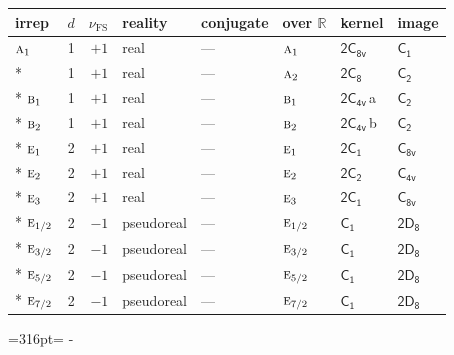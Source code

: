 \documentclass[10pt,a4paper]{article}
\makeatletter
\def\grouprule#1#2{\noalign{\marks\LTgroupmarks{\the\belowrulesep}\nobreak\vskip#1%
  \vskip\aboverulesep}\multispan\LT@cols\unskip{\leaders\hrule\@height#2\hfill\kern\z@}\cr
  \noalign{\penalty\LTrulebreak\vskip\belowrulesep\global\@lastruleclass\z@}}
\newcommand{\needspace}[1]{\par\penalty-100\begingroup\dimen0=#1\relax\dimen2=\pagegoal
  \advance\dimen2-\pagetotal\ifdim\dimen0>\dimen2\relax\ifdim\dimen2>0pt\vfil\break\fi\fi
  \endgroup}
\numberwithin{equation}{section}
\newcommand{\grp}[1]{\mathsf{#1}}
\newcommand{\irr}[1]{\text{\normalfont\scshape #1}}
\newcommand{\detbox}[1]{{\setlength{\fboxsep}{1pt}\fbox{#1}}}
\newcommand{\clsletter}[1]{\,{\scriptsize\color{black!55}#1}}
\newcommand{\fsind}{\nu_{\mathrm{FS}}}
\makeatother
\begin{document}
\setlength{\emergencystretch}{2em}\par\setlength{\emergencystretch}{0pt}
{\small\renewcommand{\arraystretch}{1.25}\setlength{\tabcolsep}{4pt}\begin{longtable}{@{}lrrlllll@{}}\toprule
irrep & $d$ & $\fsind$ & reality & conjugate & over $\mathbb{R}$ & kernel & image\\\midrule\endhead
\bottomrule\endfoot\endlastfoot
$\irr{a}_{1}$ & 1 & $+1$ & real & --- & $\irr{a}_{1}$ & \href{2C8v.pdf}{$\grp{2C_{8v}}$} & \href{../../../rotation/data/pdf/C1.pdf}{$\grp{C_{1}}$}\\*
\detbox{$\irr{a}_{2}$} & 1 & $+1$ & real & --- & $\irr{a}_{2}$ & \href{2C8.pdf}{$\grp{2C_{8}}$} & \href{../../../rotation/data/pdf/C2.pdf}{$\grp{C_{2}}$}\\*
$\irr{b}_{1}$ & 1 & $+1$ & real & --- & $\irr{b}_{1}$ & \href{2C4v.pdf}{$\grp{2C_{4v}}$}\clsletter{a} & \href{../../../rotation/data/pdf/C2.pdf}{$\grp{C_{2}}$}\\*
$\irr{b}_{2}$ & 1 & $+1$ & real & --- & $\irr{b}_{2}$ & \href{2C4v.pdf}{$\grp{2C_{4v}}$}\clsletter{b} & \href{../../../rotation/data/pdf/C2.pdf}{$\grp{C_{2}}$}\\*
$\irr{e}_{1}$ & 2 & $+1$ & real & --- & $\irr{e}_{1}$ & \href{2C1.pdf}{$\grp{2C_{1}}$} & \href{../../../rotation/data/pdf/C8v.pdf}{$\grp{C_{8v}}$}\\*
$\irr{e}_{2}$ & 2 & $+1$ & real & --- & $\irr{e}_{2}$ & \href{2C2.pdf}{$\grp{2C_{2}}$} & \href{../../../rotation/data/pdf/C4v.pdf}{$\grp{C_{4v}}$}\\*
$\irr{e}_{3}$ & 2 & $+1$ & real & --- & $\irr{e}_{3}$ & \href{2C1.pdf}{$\grp{2C_{1}}$} & \href{../../../rotation/data/pdf/C8v.pdf}{$\grp{C_{8v}}$}\\*
\grouprule{0pt}{\lightrulewidth}
$\irr{e}_{1/2}$ & 2 & $-1$ & pseudoreal & --- & $\irr{e}_{1/2}$ & \href{C1.pdf}{$\grp{C_{1}}$} & \href{2D8.pdf}{$\grp{2D_{8}}$}\\*
$\irr{e}_{3/2}$ & 2 & $-1$ & pseudoreal & --- & $\irr{e}_{3/2}$ & \href{C1.pdf}{$\grp{C_{1}}$} & \href{2D8.pdf}{$\grp{2D_{8}}$}\\*
$\irr{e}_{5/2}$ & 2 & $-1$ & pseudoreal & --- & $\irr{e}_{5/2}$ & \href{C1.pdf}{$\grp{C_{1}}$} & \href{2D8.pdf}{$\grp{2D_{8}}$}\\*
$\irr{e}_{7/2}$ & 2 & $-1$ & pseudoreal & --- & $\irr{e}_{7/2}$ & \href{C1.pdf}{$\grp{C_{1}}$} & \href{2D8.pdf}{$\grp{2D_{8}}$}\\
\bottomrule\end{longtable}}
\needspace{316pt}
\end{document}
